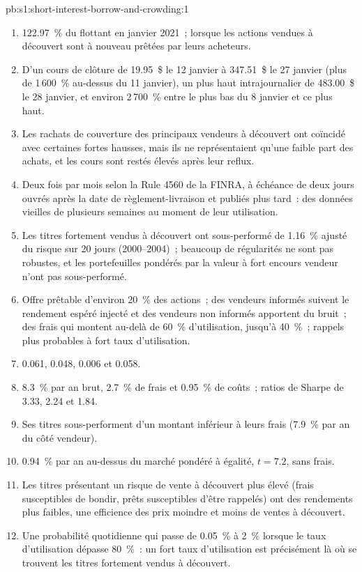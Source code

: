 \begin{solution}{pb:s1:short-interest-borrow-and-crowding:1}
\begin{enumerate}
\item 122.97~\% du flottant en janvier 2021~; lorsque les actions vendues à découvert sont à nouveau prêtées par leurs acheteurs.
\item D'un cours de clôture de 19.95~\$ le 12 janvier à 347.51~\$ le 27 janvier (plus de 1\,600~\% au-dessus du 11 janvier), un plus haut intrajournalier de 483.00~\$ le 28 janvier, et
environ 2\,700~\% entre le plus bas du 8 janvier et ce plus haut.
\item Les rachats de couverture des principaux vendeurs à découvert ont coïncidé avec certaines fortes hausses, mais ils ne représentaient qu'une faible part des achats, et les cours sont restés élevés après leur reflux.
\item Deux fois par mois selon la Rule 4560 de la FINRA, à échéance de deux jours ouvrés après la date de règlement-livraison et publiés plus tard~: des données vieilles de plusieurs semaines au moment de leur utilisation.
\item Les titres fortement vendus à découvert ont sous-performé de 1.16~\% ajusté du risque sur 20 jours (2000--2004)~; beaucoup de régularités ne sont pas robustes, et les portefeuilles pondérés par la valeur à fort
encours vendeur n'ont pas sous-performé.
\item Offre prêtable d'environ 20~\% des actions~; des vendeurs informés suivent le rendement espéré injecté et des vendeurs non informés apportent du bruit~; des frais qui montent au-delà de 60~\%
d'utilisation, jusqu'à 40~\%~; rappels plus probables à fort taux d'utilisation.
\item 0.061, 0.048, 0.006 et 0.058.
\item 8.3~\% par an brut, 2.7~\% de frais et 0.95~\% de coûts~; ratios de Sharpe de 3.33, 2.24 et 1.84.
\item Ses titres sous-performent d'un montant inférieur à leurs frais (7.9~\% par an du côté vendeur).
\item 0.94~\% par an au-dessus du marché pondéré à égalité, $t = 7.2$, sans frais.
\item Les titres présentant un risque de vente à découvert plus élevé (frais susceptibles de bondir, prêts susceptibles d'être rappelés) ont des rendements plus faibles, une efficience des prix moindre et moins de
ventes à découvert.
\item Une probabilité quotidienne qui passe de 0.05~\% à 2~\% lorsque le taux d'utilisation dépasse 80~\%~: un fort taux d'utilisation est précisément là où se trouvent les titres fortement vendus à découvert.

\end{enumerate}
\end{solution}
